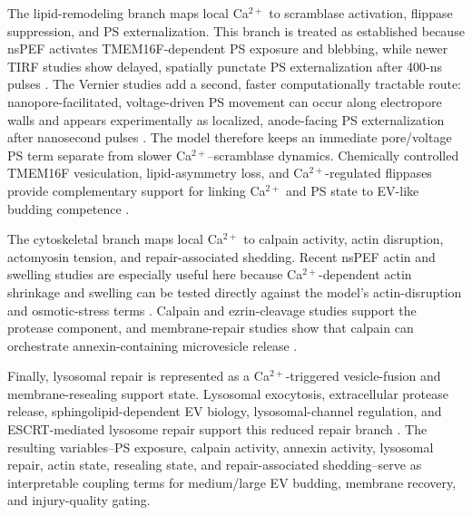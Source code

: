 The lipid-remodeling branch maps local Ca$^{2+}$ to scramblase activation, flippase suppression, and PS externalization. This branch is treated as established because nsPEF activates TMEM16F-dependent PS exposure and blebbing, while newer TIRF studies show delayed, spatially punctate PS externalization after 400-ns pulses \cite{muratori2017activation,silkunas2026peculiarities}. The Vernier studies add a second, faster computationally tractable route: nanopore-facilitated, voltage-driven PS movement can occur along electropore walls and appears experimentally as localized, anode-facing PS externalization after nanosecond pulses \cite{vernier2006nanoporeJACS,vernier2006nanoporePhysBio}. The model therefore keeps an immediate pore/voltage PS term separate from slower Ca$^{2+}$--scramblase dynamics. Chemically controlled TMEM16F vesiculation, lipid-asymmetry loss, and Ca$^{2+}$-regulated flippases provide complementary support for linking Ca$^{2+}$ and PS state to EV-like budding competence \cite{han2019chemically,wang2025loss,segawa2016human}.

The cytoskeletal branch maps local Ca$^{2+}$ to calpain activity, actin disruption, actomyosin tension, and repair-associated shedding. Recent nsPEF actin and swelling studies are especially useful here because Ca$^{2+}$-dependent actin shrinkage and swelling can be tested directly against the model's actin-disruption and osmotic-stress terms \cite{hellwich2026extracellular,pakhomov2014disassembly,rassokhin2014cellular}. Calpain and ezrin-cleavage studies support the protease component, and membrane-repair studies show that calpain can orchestrate annexin-containing microvesicle release \cite{campbell2012structure,roberts2020ca,williams2025calpains}.

Finally, lysosomal repair is represented as a Ca$^{2+}$-triggered vesicle-fusion and membrane-resealing support state. Lysosomal exocytosis, extracellular protease release, sphingolipid-dependent EV biology, lysosomal-channel regulation, and ESCRT-mediated lysosome repair support this reduced repair branch \cite{andrews2014damage,castroGomes2016plasma,verderio2018role,rosato2021two,radulovic2018escrt}. The resulting variables--PS exposure, calpain activity, annexin activity, lysosomal repair, actin state, resealing state, and repair-associated shedding--serve as interpretable coupling terms for medium/large EV budding, membrane recovery, and injury-quality gating.

